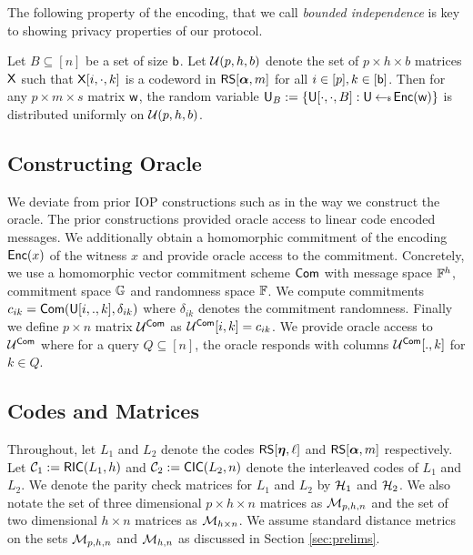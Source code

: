 The following property of the encoding, that we call {\em bounded independence}
is key to showing privacy properties of our protocol.
\begin{lemma}\label{lem:boundedindependence}
Let $B\subseteq [n]$ be a set of size $\mathsf{b}$. Let $\mathcal{U}(p,h,b)$ denote the
set of $p\times h\times b$ matrices $\mathsf{X}$ such
that $\mathsf{X}[i,\cdot,k]$ is a codeword in $\mathsf{RS}[\bm{\alpha},m]$ for all $i\in
[p],k\in [\mathsf{b}]$. Then for any $p\times m\times s$ matrix $\mathsf{w}$, the random
variable $\mathsf{U}_B := \{\mathsf{U}[\cdot,\cdot,B]: \mathsf{U}\hskip2.3pt{\gets\!\!\mbox{\tiny${\$}$\normalsize}}\, \mathsf{Enc}(\mathsf{w})\}$ is
distributed uniformly on $\mathcal{U}(p,h,b)$.
\end{lemma}


\subsection{Constructing Oracle}\label{sec:construct_oracle} 
We deviate from prior IOP constructions
such as \cite{Ligero2017,Aurora} in the way we construct the oracle. The prior
constructions provided oracle access to linear code encoded messages. We
additionally obtain a homomorphic commitment of the encoding $\mathsf{Enc}(x)$ of the
witness $x$ and provide oracle access to the commitment. Concretely, we use a
homomorphic vector commitment scheme $\mathsf{Com}$ with message space $\mathbb{F}^h$,
commitment space $\mathbb{G}$ and randomness space $\mathbb{F}$. We compute commitments
$c_{ik}=\mathsf{Com}(\mathsf{U}[i,.,k],\delta_{ik})$ where $\delta_{ik}$ denotes the
commitment randomness. Finally we define $p\times n$ matrix $\mathcal{U}^{\mathsf{Com}}$ as
$\mathcal{U}^{\mathsf{Com}}[i,k]=c_{ik}$. We provide oracle access to $\mathcal{U}^{\mathsf{Com}}$ where for a
query $Q\subseteq [n]$, the oracle responds with columns $\mathcal{U}^{\mathsf{Com}}[.,k]$ for
$k\in Q$.

\subsection{Codes and Matrices}\label{sec:codesandmatrices}
Throughout, let $L_1$ and $L_2$ denote the codes $\mathsf{RS}[\bm{\eta},\ell]$ and
$\mathsf{RS}[\bm{\alpha},m]$ respectively. Let $\mathcal{C}_1 := \mathsf{RIC}(L_1,h)$ and $\mathcal{C}_2 :=
\mathsf{CIC}(L_2,n)$ denote the interleaved codes of $L_1$ and $L_2$. We denote the
parity check matrices for $L_1$ and $L_2$ by $\mathcal{H}_1$ and $\mathcal{H}_2$. We also
notate the set of three dimensional $p\times h\times n$ matrices as $\mathcal{M}_{p,h,n}$ and
the set of two dimensional $h\times n$ matrices as $\mathcal{M}_{h\times n}$. We
assume standard distance metrics on the sets $\mathcal{M}_{p,h,n}$ and $\mathcal{M}_{h,n}$
as discussed in Section \ref{sec:prelims}. 

